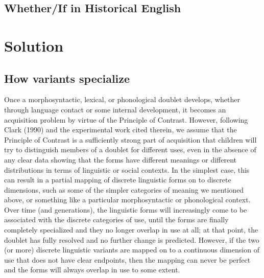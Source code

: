 \subsection{Whether/If in Historical English}

\section{Solution}
\label{solution}
 \subsection{How variants specialize}
Once a morphosyntactic, lexical, or phonological doublet develops, whether through language contact or some internal development, it becomes an acquisition problem by virtue of the Principle of Contrast. 
However, following Clark (1990) and the experimental work cited therein, we assume that the Principle of Contrast is a sufficiently strong part of acquisition that children will try to distinguish members of a doublet for different uses, even in the absence of any clear data showing that the forms have different meanings or different distributions in terms of linguistic or social contexts. 
In the simplest case, this can result in a partial mapping of discrete linguistic forms on to discrete dimensions, such as some of the simpler categories of meaning we mentioned above, or something like a particular morphosyntactic or phonological context. 
Over time (and generations), the linguistic forms will increasingly come to be associated with the discrete categories of use, until the forms are finally completely specialized and they no longer overlap in use at all; at that point, the doublet has fully resolved and no further change is predicted.
However, if the two (or more) discrete linguistic variants are mapped on to a continuous dimension of use that does not have clear endpoints, then the mapping can never be perfect and the forms will always overlap in use to some extent.

